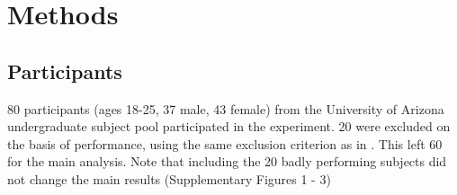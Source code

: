 \documentclass[12pt]{article}
\begin{document}
	
	
	
	\section*{Methods}
	\subsection*{Participants}
	
	80 participants (ages 18-25, 37 male, 43 female) from the University of Arizona undergraduate subject pool participated in the experiment. 20 were excluded on the basis of performance, using the same exclusion criterion as in \citep{wilson2014}. This left 60 for the main analysis. Note that including the 20 badly performing subjects did not change the main results (Supplementary Figures 1 - 3)%
	
	
	
\end{document}
